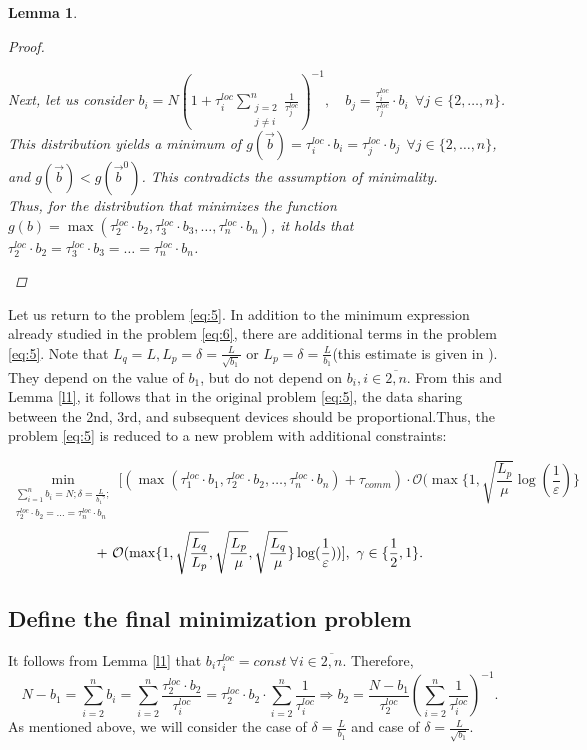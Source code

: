\documentclass{article}
\newtheorem{lemma}[theorem]{Lemma}
\begin{document}
\begin{lemma}
\begin{proof}
\begin{spacing}{1.35}
        Next, let us consider $b_i = N(1 + \tau_i^{loc}\sum\limits_{\substack{j = 2 \\ j \neq i}}^n \frac{1}{\tau_j^{loc}})^{-1}, \quad b_j = \frac {\tau_i^{loc}}{\tau_j^{loc}}\cdot b_i  ~~ \forall j \in \{2,\ldots,n\}$. 
        This distribution yields a minimum of $g(\overrightarrow{b}) = \tau_i^{loc}\cdot b_i = \tau_j^{loc}\cdot b_j ~~ \forall j \in \{2,\ldots,n\}$, and $g(\overrightarrow{b}) < g(\overrightarrow{b}^0)$. 
        This contradicts the assumption of minimality. 
        \\
        Thus, for the distribution that minimizes the function $g(b) = \max(\tau_2^{loc}\cdot b_2, \tau_3^{loc}\cdot b_3, \ldots, \tau_n^{loc}\cdot b_n)$, it holds that $\tau_2^{loc}\cdot b_2 = \tau_3^{loc}\cdot b_3 = \ldots = \tau_n^{loc}\cdot b_n$.
        \end{spacing}
    \end{proof}
\end{lemma}
Let us return to the problem \eqref{eq:5}. In addition to the minimum expression already studied in the problem \eqref{eq:6}, there are additional terms in the problem \eqref{eq:5}. Note that $L_q = L, L_p = \delta = \frac{L}{\sqrt{b_1}}$ or $L_p = \delta = \frac{L}{b_1}$(this estimate is given in \cite{kovalev2022optimal}).  They depend on the value of $b_1$, but do not depend on $b_i, i \in \overline{2, n}$. From this and Lemma \ref{l1}, it follows that in the original problem \eqref{eq:5}, the data sharing between the 2nd, 3rd, and subsequent devices should be proportional.Thus, the problem \eqref{eq:5} is reduced to a new problem with additional constraints:

\begin{equation}
    \label{eq:7}
    \min_{\substack{
    \sum\limits_{i = 1}^{n} b_i = N; \delta = \frac{L}{{b_1}^\gamma};\\
   \tau_2^{loc}\cdot b_2 = \ldots = \tau_n^{loc}\cdot b_n
  }} 
    [(\max(\tau_1^{loc}\cdot b_1, \tau_2^{loc}\cdot b_2, \ldots , \tau_n^{loc}\cdot b_n) + \tau_{comm}) \cdot \mathcal O(\max\{1, \sqrt{\frac{L_p}{\mu}}\log(\frac{1}{\varepsilon})\} 
\end{equation}
\begin{equation}
     \notag
     + ~
    \mathcal O(\max\{1,\sqrt{\frac{L_q}{L_p}}, \sqrt{\frac{L_p}{\mu}}, \sqrt{\frac{L_q}{\mu}}\}\log(\frac{1}{\varepsilon}))] ,  ~ \gamma \in \{\frac{1}{2}, 1\}.
\end{equation}



\subsection{Define the final minimization problem}
It follows from Lemma \ref{l1} that $b_i \tau_i^{loc} = const ~ \forall i \in \overline{2, n}$.
Therefore, $$ N - b_1 = \sum\limits_{i = 2}^{n} b_i = \sum\limits_{i = 2}^{n} \frac{\tau_2^{loc}\cdot b_2}{\tau_i^{loc}} = \tau_2^{loc}\cdot b_2 \cdot \sum\limits_{i = 2}^{n} \frac{1}{\tau_i^{loc}} \Rightarrow
b_2 = \frac{N - b_1}{\tau_2 ^{loc}}(\sum\limits_{i = 2}^{n} \frac{1}{\tau_i^{loc}})^{-1}.$$
As mentioned above, we will consider the case of $\delta = \frac{L}{b_1}$ and case of $\delta = \frac{L}{\sqrt{b_1}}$.
\end{document}
